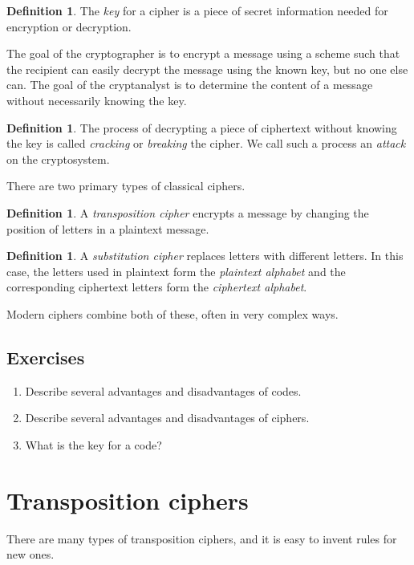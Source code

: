 \documentclass{book}
\theoremstyle{plain}
\theoremstyle{definition}
\newtheorem{definition}[theorem]{Definition}
\newif\ifprintsolutions
\newcommand{\solution}[1]{\ifprintsolutions \begin{sloppypar}{\it #1}\end{sloppypar} \fi} %
\begin{document}
\begin{definition}
The {\it key} for a cipher is a piece of secret information needed for encryption or decryption.
\end{definition}

The goal of the cryptographer is to encrypt a message using a scheme such that the recipient can easily decrypt the message using the known key, but no one else can. The goal of the cryptanalyst is to determine the content of a message without necessarily knowing the key.

\begin{definition}
The process of decrypting a piece of ciphertext without knowing the key is called {\it cracking} or {\it breaking} the cipher. We call such a process an {\it attack} on the cryptosystem.
\end{definition}

There are two primary types of classical ciphers.

\begin{definition}
A {\it transposition cipher} encrypts a message by changing the position of letters in a plaintext message.
\end{definition}

\begin{definition}
A {\it substitution cipher} replaces letters with different letters. In this case, the letters used in plaintext form the {\it plaintext alphabet} and the corresponding ciphertext letters form the {\it ciphertext alphabet}.
\end{definition}

Modern ciphers combine both of these, often in very complex ways.

\section{Exercises}
\begin{enumerate}
\item Describe several advantages and disadvantages of codes.
\item Describe several advantages and disadvantages of ciphers.
\item What is the key for a code? \solution{The key for a code is the codeword for every word used in a message.}
\end{enumerate}

\chapter{Transposition ciphers}
There are many types of transposition ciphers, and it is easy to invent rules for new ones.
\end{document}
